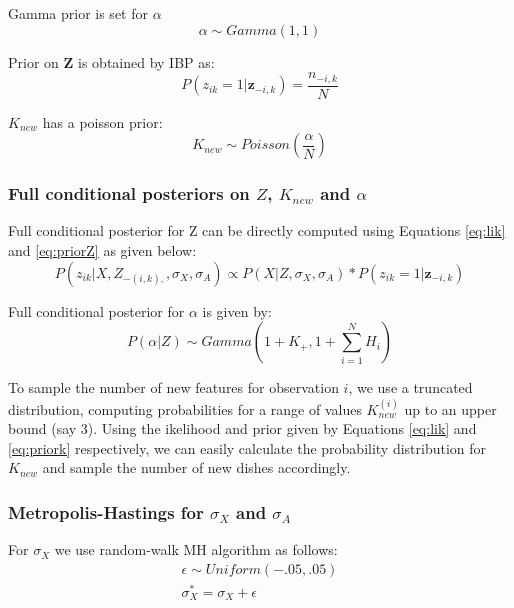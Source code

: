 \documentclass{article}
\begin{document}
Gamma prior is set for $\alpha$
\begin{equation}\label{eq:prioralpha}
\alpha \sim Gamma(1,1)
\end{equation}

Prior on \textbf{Z} is obtained by IBP as:
\begin{equation}\label{eq:priorZ}
P(z_{ik}=1|\textbf{z}_{-i,k}) = \frac{n_{-i,k}}{N}
\end{equation}

$K_{new}$ has a poisson prior:
\begin{equation}\label{eq:priork}
K_{new} \sim Poisson(\frac{\alpha}{N})
\end{equation}



\subsubsection{Full conditional posteriors on $Z$, $K_{new}$ and $\alpha$}
Full conditional posterior for Z can be directly computed using Equations \eqref{eq:lik} and \eqref{eq:priorZ} as given below:
\begin{equation}\label{eq:postZ}
P(z_{ik}|X,Z_{-(i,k),},\sigma_X,\sigma_A) \propto  P(X|Z,\sigma_X, \sigma_A) * P(z_{ik}=1|\textbf{z}_{-i,k}) 
\end{equation}

Full conditional posterior for $\alpha$ is given by:
\begin{equation}\label{eq:postalpha}
P(\alpha|Z) \sim Gamma(1+K_+,1+\sum_{i=1}^{N} H_i)
\end{equation}

To sample the number of new features for observation $i$, we use a truncated distribution, computing probabilities for a range of values $K_{new}^{(i)}$ up to an upper bound (say 3). Using the ikelihood and prior given by Equations \eqref{eq:lik} and \eqref{eq:priork} respectively, we can easily calculate the probability distribution for $K_{new}$ and sample the number of new dishes accordingly.




\subsubsection{Metropolis-Hastings for $\sigma_X$ and $\sigma_A$}
For $\sigma_X$ we use random-walk MH algorithm as follows:
\begin{eqnarray}
\epsilon \sim Uniform(-.05,.05)\\
\sigma_X^{*} =  \sigma_X +\epsilon\\
\end{eqnarray}
\end{document}
